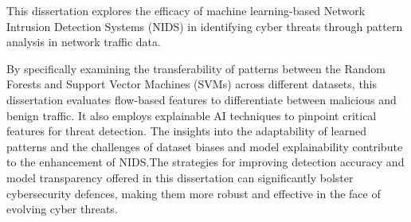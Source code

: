 This dissertation explores the efficacy of machine learning-based Network Intrusion Detection Systems (NIDS) in identifying cyber threats through pattern analysis in network traffic data.

\noindent By specifically examining the transferability of patterns between the Random Forests and Support Vector Machines (SVMs) across different datasets, this dissertation evaluates flow-based features to differentiate between malicious and benign traffic. It also employs explainable AI techniques to pinpoint critical features for threat detection. The insights into the adaptability of learned patterns and the challenges of dataset biases and model explainability contribute to the enhancement of NIDS.\@ The strategies for improving detection accuracy and model transparency offered in this dissertation can significantly bolster cybersecurity defences, making them more robust and effective in the face of evolving cyber threats.